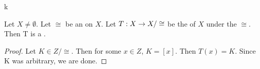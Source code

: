 k\label{prop:QuotientMapSurjective}
\begin{prop}
    Let $X \neq \emptyset$. 
    Let $\cong$ be an 
	\EquivalenceRelation on 
	$X$.
    Let $T : X\to X/\cong$  be the 
	\QuotientMap of $X$ under the 
	\Relation
	$\cong$. 
    Then T is a 
	\Surjection. 
    \begin{proof}
       Let $K \in Z/\cong$. 
       Then for some $x \in Z$, $K=[x]$. 
       Then $T(x) = K$. 
       Since K was arbitrary, we are done. 
    \end{proof}
\end{prop} 